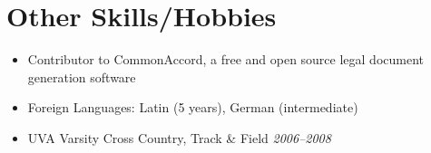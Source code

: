 \documentclass[a4paper,11pt]{article}
\begin{document}

\vskip 4pt
\section*{Other Skills/Hobbies}
\vskip 5pt

  \begin{itemize}
    \item Contributor to CommonAccord, a free and open source legal document generation software
    \item Foreign Languages: Latin (5 years), German (intermediate)
    \item UVA Varsity Cross Country, Track \& Field \hfill \textit{2006--2008}
  \end{itemize}
\end{document}

